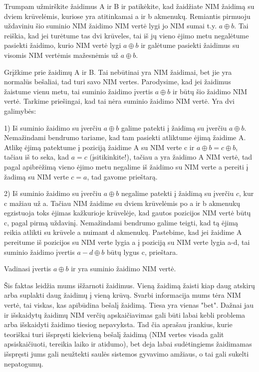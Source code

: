 Trumpam užmirškite žaidimus A ir B ir patikėkite, kad žaidžiate NIM žaidimą su
dviem krūvelėmis, kuriose yra atitinkamai a ir b akmenukų. Remiantis pirmuoju
uždaviniu šio suminio NIM žaidimo NIM vertė lygi jo NIM sumai t.y.
$a\oplus
b$. Tai reiškia, kad jei turėtume tas dvi krūveles, tai iš jų vieno ėjimo metu
negalėtume pasiekti žaidimo, kurio NIM vertė lygi  $a\oplus b$ ir galėtume
pasiekti žaidimus su visomis NIM vertėmis mažesnėmis už $a\oplus b$. 

Grįžkime prie žaidimų A ir B. Tai nebūtinai yra NIM žaidimai, bet jie yra
normalūs bešaliai, tad turi savo NIM vertes. Parodysime, kad jei žaidimus
žaistume vienu metu, tai suminio žaidimo įvertis  $a\oplus b$ ir būtų šio
žaidimo NIM vertė. Tarkime priešingai, kad tai nėra suminio žaidimo NIM vertė.
Yra dvi galimybės:

1) Iš suminio žaidimo su įverčiu $a\oplus b$ galime patekti į žaidimą su
įverčiu $a\oplus b$. Nemažindami bendrumo tariame, kad tam pasiekti atliktume
ėjimą žaidime A. Atlikę ėjimą patektume į poziciją žaidime A su NIM verte c ir
$a\oplus b = c\oplus b$, tačiau iš to seka, kad $a=c$ (įsitikinkite!), tačiau
a yra žaidimo A NIM vertė, tad pagal apibrėžimą vieno ėjimo metu negalime iš
žaidimo su NIM verte a pereiti į žadimą su NIM verte $c=a$, tad gavome
prieštarą.

2) Iš suminio žaidimo su įverčiu $a\oplus b$ negalime patekti į žaidimą su
įverčiu $c$, kur c mažiau už a. Tačiau NIM žaidime su dviem krūvelėmis po a ir
b akmenukų egzistuoja toks ėjimas kažkurioje krūvelėje, kad gautos pozicijos
NIM vertė būtų c, pagal pirmą uždavinį. Nemažindami bendrumo galime teigti, kad
tą ėjimą reikia atlikti su krūvele a nuimant d akmenukų. Pastebime, kad jei
žaidime A pereitume iš pozicijos su NIM verte lygia a į poziciją su NIM verte
lygia a-d, tai suminio žaidimo įvertis  $a-d\oplus b$ būtų lygus c, prieštara.

Vadinasi įvertis $a\oplus b$ ir yra suminio žaidimo NIM vertė.

Šis faktas leidžia mums išžarnoti žaidimus. Vieną žaidimą žaisti kiap daug
atskirų arba suplakti daug žaidimų į vieną krūvą. Svarbi informacija mums tėra
NIM vertė, tai viskas, kas apibūdina bešalį žaidimą. Tiesa yra vienas "bet".
Dažnai jau ir išskaidytų žaidimų NIM verčių apskaičiavimas gali būti labai
kebli problema arba išskaidyti žaidimo tiesiog nepavyksta. Tad čia aprašau
įrankius, kurie teoriškai turi išspręsti kiekvieną bešalį žaidimą (NIM vertes
visada galit apsiskaičiuoti, tereikia laiko ir atidumo), bet deja labai
sudėtingiems žaidimamas išspręsti jums gali neužtekti saulės sistemos gyvavimo
amžiaus, o tai gali sukelti nepatogumų.

